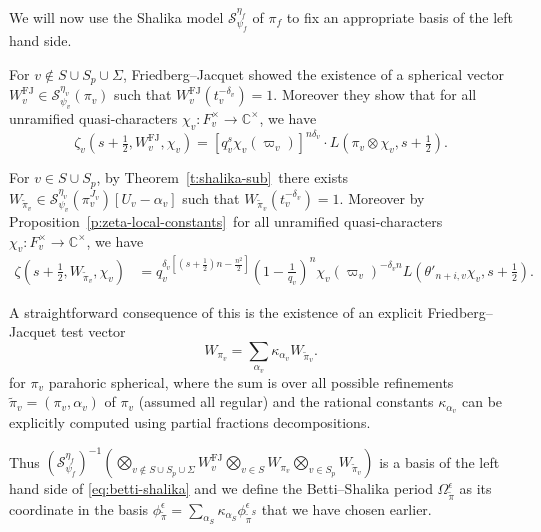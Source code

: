 \documentclass{amsart}
\theoremstyle{definition}
\newcommand{\C}{\mathbb{C}}
\begin{document}
{We will now use the Shalika model $\mathcal{S}_{\psi_f}^{\eta_f}$ of $\pi_f$ to fix an appropriate  basis of the left hand side. 

For $v\notin S\cup S_p\cup \Sigma$, Friedberg--Jacquet \cite{friedberg-jacquet} showed the existence of a  spherical vector $W^{\mathrm{FJ}}_v \in \mathcal{S}_{\psi_v}^{\eta_v}(\pi_v)$  such that $W^{\mathrm{FJ}}_v(t_v^{-\delta_v})=1$. Moreover they show that 
for all unramified quasi-characters $\chi_v : F_v^\times \to \C^\times$, we have
\begin{equation}\label{eq:jacquet-friedberg test vector}
	\zeta_v\left(s+\tfrac{1}{2}, W^{\mathrm{FJ}}_v, \chi_v\right) = [q_v^s\chi_v(\varpi_v)]^{n\delta_v}\cdot L\left(\pi_v \otimes \chi_v,s+\tfrac{1}{2}\right). 
\end{equation}

For $v\in S\cup S_p$, by Theorem~\ref{t:shalika-sub}~there exists $W_{\widetilde\pi_v}\in \mathcal{S}_{\psi_v}^{\eta_v}(\pi_v^{J_v})[ U_v-\alpha_v]$ such that  $W_{\widetilde\pi_v}(t_v^{-\delta_v})=1$. Moreover by 	 Proposition~\ref{p:zeta-local-constants}~for all unramified quasi-characters $\chi_v : F_v^\times \to \C^\times$,
 we have
 \begin{align*}
\zeta(s+\tfrac{1}{2},W_{\widetilde\pi_v},\chi_v)&=q_v^{\delta_v \left[(s+\frac{1}{2})n-\frac{n^2}{2}\right]}\left(1-\frac{1}{q_v}\right)^n\chi_v(\varpi_v)^{-\delta_v n}L(\theta'_{n+i,v}\chi_v,s+\tfrac{1}{2}).
\end{align*}

A straightforward consequence of this  is the existence of an explicit  Friedberg--Jacquet test vector
\[W_{\pi_v}=\sum\limits_{\alpha_v} \kappa_{\alpha_v} W_{\widetilde\pi_v}.\]
for $\pi_v$ parahoric spherical, where the sum is over all possible refinements $\widetilde\pi_v=(\pi_v,\alpha_v)$ of $\pi_v$ (assumed all regular) and 
the rational constants $\kappa_{\alpha_v}$ can be explicitly computed using partial fractions decompositions.

Thus  $\left(\mathcal{S}_{\psi_f}^{\eta_f}\right)^{-1}\left(\bigotimes_{v\notin S\cup S_p\cup \Sigma} W^{\mathrm{FJ}}_v 
\bigotimes_{v\in  S} W_{\pi_v} \bigotimes_{v\in  S_p} W_{\widetilde\pi_v}\right)$ is a   basis of the left hand side of \eqref{eq:betti-shalika} and we define the Betti--Shalika period
$\Omega_{\widetilde\pi}^\epsilon$ as its coordinate in the basis $\phi_{\widetilde\pi}^\epsilon=
\sum\limits_{\alpha_S} \kappa_{\alpha_S} \phi_{\widetilde\pi^S}^\epsilon$ that we have  chosen earlier. 
	
}
\end{document}
